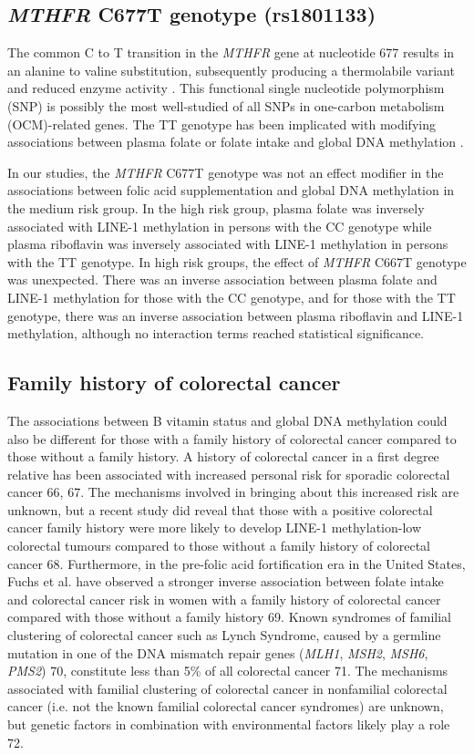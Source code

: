 \subsection{\emph{MTHFR} C677T genotype (rs1801133)} %
The common C to T transition in the \emph{MTHFR} gene at nucleotide 677 results in an alanine to valine substitution, subsequently producing a thermolabile variant and reduced enzyme activity \cite{c76}. This functional single nucleotide polymorphism (SNP) is possibly the most well-studied of all SNPs in one-carbon metabolism (OCM)-related genes. The TT genotype has been implicated with modifying associations between plasma folate or folate intake and global DNA methylation \cite{c75,c76,c712,c764,c765}. 
 
\noindent In our studies, the \emph{MTHFR} C677T genotype was not an effect modifier in the associations between folic acid supplementation and global DNA methylation in the medium risk group. In the high risk group, plasma folate was inversely associated with LINE-1 methylation in persons with the CC genotype while plasma riboflavin was inversely associated with LINE-1 methylation in persons with the TT genotype. In high risk groups, the effect of \emph{MTHFR} C667T genotype was unexpected. There was an inverse association between plasma folate and LINE-1 methylation for those with the CC genotype, and for those with the TT genotype, there was an inverse association between plasma riboflavin and LINE-1 methylation, although no interaction terms reached statistical significance. 
 
\subsection{Family history of colorectal cancer} %
The associations between B vitamin status and global DNA methylation could also be different for those with a family history of colorectal cancer compared to those without a family history. A history of colorectal cancer in a first degree relative has been associated with increased personal risk for sporadic colorectal cancer 66, 67. The mechanisms involved in bringing about this increased risk are unknown, but a recent study did reveal that those with a positive colorectal cancer family history were more likely to develop LINE-1 methylation-low colorectal tumours compared to those without a family history of colorectal cancer 68. Furthermore, in the pre-folic acid fortification era in the United States, Fuchs et al. have observed a stronger inverse association between folate intake and colorectal cancer risk in women with a family history of colorectal cancer compared with those without a family history 69. Known syndromes of familial clustering of colorectal cancer such as Lynch Syndrome, caused by a 
germline mutation in one of the DNA mismatch repair genes (\emph{MLH1}, \emph{MSH2}, \emph{MSH6}, \emph{PMS2}) 70, constitute less than 5\% of all colorectal cancer 71. The mechanisms associated with familial clustering of colorectal cancer in nonfamilial colorectal cancer (i.e. not the known familial colorectal cancer syndromes) are unknown, but genetic factors in combination with environmental factors likely play a role 72. 
 

